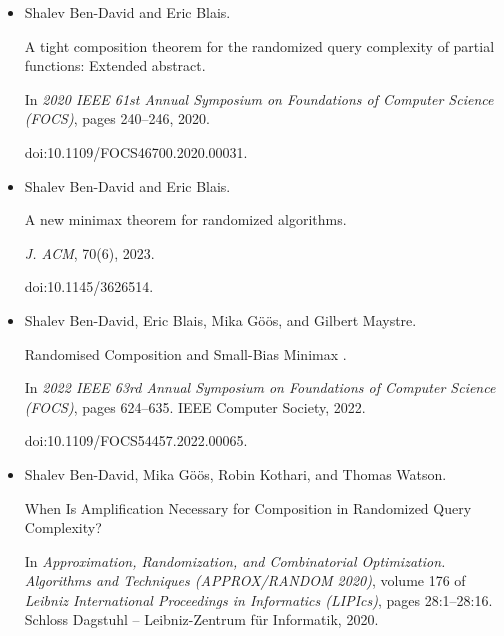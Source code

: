 \begin{itemize}
In \emph{14th Innovations in Theoretical Computer Science Conference
(ITCS 2023)}, volume 251 of \emph{Leibniz International Proceedings in
Informatics (LIPIcs)}, pages 14:1–14:17. Schloss Dagstuhl – Leibniz-Zentrum
für Informatik, 2023.


doi:10.4230/LIPIcs.ITCS.2023.14.





\item[] 
[6]

Shalev Ben-David and Eric Blais.


A tight composition theorem for the randomized query complexity of
partial functions: Extended abstract.


In \emph{2020 IEEE 61st Annual Symposium on Foundations of Computer
Science (FOCS)}, pages 240–246, 2020.


doi:10.1109/FOCS46700.2020.00031.





\item[] 
[7]

Shalev Ben-David and Eric Blais.


A new minimax theorem for randomized algorithms.


\emph{J. ACM}, 70(6), 2023.


doi:10.1145/3626514.





\item[] 
[8]

Shalev Ben-David, Eric Blais, Mika Göös, and Gilbert Maystre.


 Randomised Composition and Small-Bias Minimax .


In \emph{2022 IEEE 63rd Annual Symposium on Foundations of Computer
Science (FOCS)}, pages 624–635. IEEE Computer Society, 2022.


doi:10.1109/FOCS54457.2022.00065.





\item[] 
[9]

Shalev Ben-David, Mika Göös, Robin Kothari, and Thomas Watson.


When Is Amplification Necessary for Composition in Randomized Query
Complexity?


In \emph{Approximation, Randomization, and Combinatorial Optimization.
Algorithms and Techniques (APPROX/RANDOM 2020)}, volume 176 of \emph{Leibniz
International Proceedings in Informatics (LIPIcs)}, pages 28:1–28:16.
Schloss Dagstuhl – Leibniz-Zentrum für Informatik, 2020.



\end{itemize}
